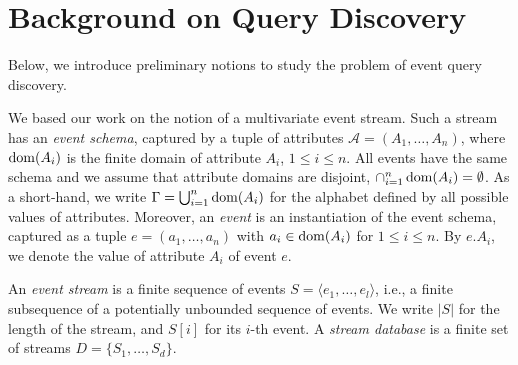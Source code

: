 \section{Background on Query Discovery}
\label{sec:problem-setting}
%
Below, we introduce preliminary notions to study
the problem of event query discovery.



We based our work on the notion of a multivariate event
stream. Such a stream has an \emph{event schema}, captured
by a tuple of attributes $\mathcal{A}= (A_1, \ldots,
A_n)$, where $\operatorname{dom}(A_i)$ is the finite domain of attribute
$A_i$, $1\leq i\leq n$. All events have the same schema
and we assume that attribute domains are disjoint,
$\cap_{i=1}^n \operatorname{dom}(A_i) =
\emptyset$. As a short-hand, we write $\Gamma =
\bigcup_{i=1}^n{\operatorname{dom}(A_i)}$ for the alphabet defined by
all possible values of attributes. Moreover, an
\emph{event} is an instantiation of the event schema,
captured as a tuple $e=(a_1, \ldots, a_n)$ with $a_i\in
\operatorname{dom}(A_i)$ for $1\leq
i\leq n$. By $e.A_i$, we denote the value of attribute
$A_i$ of event $e$.

An \emph{event stream} is a finite
sequence of events $S=\langle e_1, \ldots, e_l
\rangle$, i.e., a finite subsequence of a
potentially unbounded sequence of events. We write $|S|$
for the length of the stream, and $S[i]$ for its $i$-th
event. A \emph{stream database} is a finite set of
streams $D=\{S_1,\ldots, S_d\}$.

